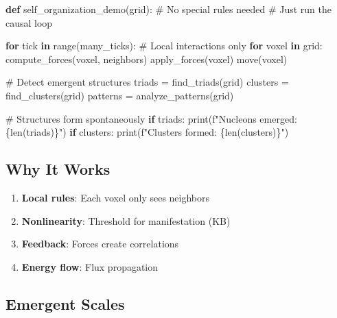 \documentclass[
  11pt,
  letterpaper,
  twoside,
  openright]{book}
\newenvironment{Shaded}{\begin{snugshade}}{\end{snugshade}}
\newcommand{\BuiltInTok}[1]{\textcolor[rgb]{0.00,0.23,0.31}{#1}}
\newcommand{\CommentTok}[1]{\textcolor[rgb]{0.37,0.37,0.37}{#1}}
\newcommand{\ControlFlowTok}[1]{\textcolor[rgb]{0.00,0.23,0.31}{\textbf{#1}}}
\newcommand{\KeywordTok}[1]{\textcolor[rgb]{0.00,0.23,0.31}{\textbf{#1}}}
\newcommand{\NormalTok}[1]{\textcolor[rgb]{0.00,0.23,0.31}{#1}}
\newcommand{\OperatorTok}[1]{\textcolor[rgb]{0.37,0.37,0.37}{#1}}
\newcommand{\SpecialCharTok}[1]{\textcolor[rgb]{0.37,0.37,0.37}{#1}}
\newcommand{\SpecialStringTok}[1]{\textcolor[rgb]{0.13,0.47,0.30}{#1}}
\providecommand{\tightlist}{%
  \setlength{\itemsep}{0pt}\setlength{\parskip}{0pt}}
\begin{document}
\begin{Shaded}
\begin{Highlighting}[]
\KeywordTok{def}\NormalTok{ self\_organization\_demo(grid):}
    \CommentTok{\# No special rules needed}
    \CommentTok{\# Just run the causal loop}

    \ControlFlowTok{for}\NormalTok{ tick }\KeywordTok{in} \BuiltInTok{range}\NormalTok{(many\_ticks):}
        \CommentTok{\# Local interactions only}
        \ControlFlowTok{for}\NormalTok{ voxel }\KeywordTok{in}\NormalTok{ grid:}
\NormalTok{            compute\_forces(voxel, neighbors)}
\NormalTok{            apply\_forces(voxel)}
\NormalTok{            move(voxel)}

        \CommentTok{\# Detect emergent structures}
\NormalTok{        triads }\OperatorTok{=}\NormalTok{ find\_triads(grid)}
\NormalTok{        clusters }\OperatorTok{=}\NormalTok{ find\_clusters(grid)}
\NormalTok{        patterns }\OperatorTok{=}\NormalTok{ analyze\_patterns(grid)}

        \CommentTok{\# Structures form spontaneously}
        \ControlFlowTok{if}\NormalTok{ triads:}
            \BuiltInTok{print}\NormalTok{(}\SpecialStringTok{f"Nucleons emerged: }\SpecialCharTok{\{}\BuiltInTok{len}\NormalTok{(triads)}\SpecialCharTok{\}}\SpecialStringTok{"}\NormalTok{)}
        \ControlFlowTok{if}\NormalTok{ clusters:}
            \BuiltInTok{print}\NormalTok{(}\SpecialStringTok{f"Clusters formed: }\SpecialCharTok{\{}\BuiltInTok{len}\NormalTok{(clusters)}\SpecialCharTok{\}}\SpecialStringTok{"}\NormalTok{)}
\end{Highlighting}
\end{Shaded}

\subsection{Why It Works}\label{why-it-works}

\begin{enumerate}
\def\labelenumi{\arabic{enumi}.}
\tightlist
\item
  \textbf{Local rules}: Each voxel only sees neighbors
\item
  \textbf{Nonlinearity}: Threshold for manifestation (KB)
\item
  \textbf{Feedback}: Forces create correlations
\item
  \textbf{Energy flow}: Flux propagation
\end{enumerate}

\subsection{Emergent Scales}\label{emergent-scales}
\end{document}
